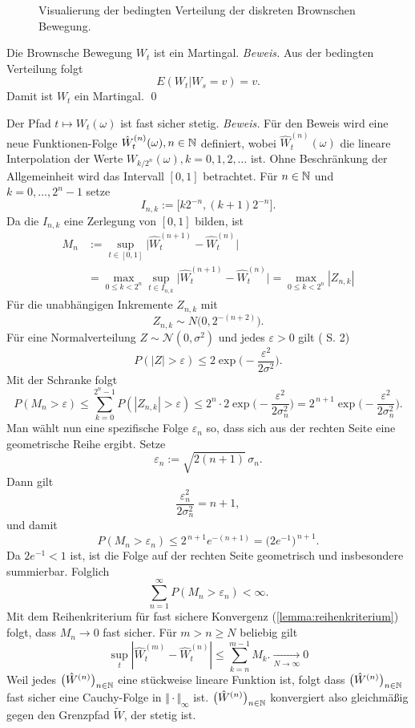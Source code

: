 \begin{bem}
\begin{figure}[H]
\begin{minipage}{0.48\textwidth}
    \caption{Visualierung der bedingten Verteilung der diskreten Brownschen Bewegung.}
    \label{fig:bb_with_cov}
  \end{minipage}
\end{figure}
\end{bem}

\begin{korr}
Die Brownsche Bewegung $W_t$ ist ein Martingal.
\textit{Beweis.} Aus der bedingten Verteilung folgt
$$
E(W_t | W_s = v) = v.
$$
Damit ist $W_t$ ein Martingal. \qed
\end{korr}  

\begin{satz}
Der Pfad $t \mapsto W_t(\omega)$ ist fast sicher stetig.
\textit{Beweis.}
Für den Beweis wird eine neue Funktionen-Folge $\hat W_t^{(n)}(\omega), n \in \Bbb N$
definiert, wobei $\hat W_t^{(n)}(\omega)$ die lineare Interpolation der Werte $W_{k/2^n}(\omega), k=0,1,2,\ldots$ ist. 
Ohne Beschränkung der Allgemeinheit wird das Intervall $[0,1]$ betrachtet. Für $n \in \Bbb N$ und $k=0,\dots,2^n-1$ setze
$$I_{n,k}:=\big[k2^{-n},(k+1)2^{-n}\big].$$
Da die $I_{n,k}$ eine Zerlegung von $[0,1]$ bilden, ist
$$
\begin{aligned}
M_n &:=\sup_{t\in[0,1]}\big|\hat W^{(n+1)}_t-\hat W^{(n)}_t\big| 
\\ &= \max_{0\le k<2^n} \sup_{t\in I_{n,k}} \big|\hat W^{(n+1)}_t-\hat W^{(n)}_t\big| =\max_{0\le k<2^n}|Z_{n,k}|
\end{aligned}
$$
Für die unabhängigen Inkremente $Z_{n,k}$ mit
$$
Z_{n,k}\sim N\!\big(0,2^{-(n+2)}\big).
$$
Für eine Normalverteilung $Z\sim \mathcal N(0,\sigma^2)$ und jedes $\varepsilon>0$ gilt (\cite{boucheron_concentration_2013} S. 2)
$$
P(|Z| >\varepsilon) \le 2\exp\!\Big(-\frac{\varepsilon^2}{2\sigma^2}\Big).
$$
Mit der Schranke folgt
$$
P(M_n>\varepsilon) \le \sum_{k=0}^{2^n-1} P(|Z_{n,k}|>\varepsilon)
\le 2^n\cdot 2\exp\!\Big(-\frac{\varepsilon^2}{2\sigma_n^2}\Big)
= 2^{\,n+1}\exp\!\Big(-\frac{\varepsilon^2}{2\sigma_n^2}\Big).
$$
Man wählt nun eine spezifische Folge $\varepsilon_n$ so, dass sich aus der rechten Seite eine geometrische Reihe ergibt. Setze
$$
\varepsilon_n := \sqrt{2(n+1)}\,\sigma_n.
$$
Dann gilt
$$
\frac{\varepsilon_n^2}{2\sigma_n^2}=n+1,
$$
und damit
$$
P(M_n>\varepsilon_n)\le 2^{\,n+1} e^{-(n+1)} = \big(2e^{-1}\big)^{\,n+1}.
$$
Da $2e^{-1}<1$ ist, ist die Folge auf der rechten Seite geometrisch und insbesondere summierbar. Folglich
$$
\sum_{n=1}^\infty P(M_n>\varepsilon_n) < \infty.
$$
Mit dem Reihenkriterium für fast sichere Konvergenz (\ref{lemma:reihenkriterium}) folgt, dass $M_n\to 0$ fast sicher.
Für $m \gt n \ge N$ beliebig gilt
$$\sup_{t}|\hat W^{(m)}_t - \hat W^{(n)}_t| \leq \sum_{k=n}^{m-1} M_k. \underset{N \to \infty} \longrightarrow 0$$
Weil jedes $\big(\hat W^{(n)}\big)_{n\in\Bbb N}$ eine stückweise lineare Funktion ist, folgt
dass $\big(\hat W^{(n)}\big)_{n\in\Bbb N}$ fast sicher eine Cauchy-Folge in $\Vert \cdot \Vert_{\infty}$ ist.
$\big(\hat W^{(n)}\big)_{n\in\Bbb N}$ konvergiert also gleichmäßig gegen den Grenzpfad $\widetilde W$, der stetig ist. 


\end{satz}
